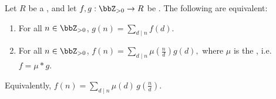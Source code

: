 \begin{proposition} \label{proposition:mobius_inversion_formula}
    Let $R$ be a , and let $f, g: \bbZ_{>0} \to R$ be . The following are equivalent:
    \begin{enumerate}
        \item For all $n \in \bbZ_{>0}$, $g(n) = \sum_{d \mid n} f(d).$
        \item For all $n \in \bbZ_{>0}$, $f(n) = \sum_{d \mid n} \mu\left(\frac{n}{d}\right) g(d),$ where $\mu$ is the , i.e. $f = \mu * g$.
    \end{enumerate}
    Equivalently, $f(n) = \sum_{d \mid n} \mu(d)\, g\left(\frac{n}{d}\right).$
\end{proposition}
